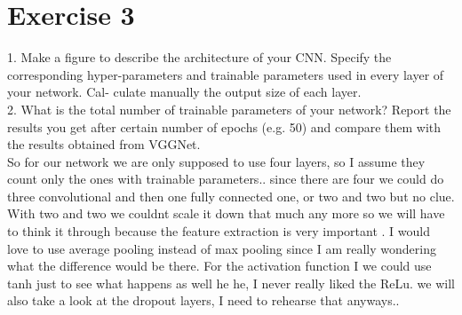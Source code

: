 \section*{Exercise 3}





1. Make a figure to describe the architecture of your CNN. Specify the corresponding
hyper-parameters and trainable parameters used in every layer of your network. Cal-
culate manually the output size of each layer. \\
2. What is the total number of trainable parameters of your network? Report the results
you get after certain number of epochs (e.g. 50) and compare them with the results
obtained from VGGNet.\\

So for our network we are only supposed to use four layers, so I assume they count only the ones with trainable parameters.. since there are four we could do three convolutional and then one fully connected one, or two and two but no clue. With two and two we couldnt scale it down that much any more so we will have to think it through because the feature extraction is very important . 
I would love to use average pooling instead of max pooling since I am really wondering what the difference would be there.
For the activation function I we could use tanh just to see what happens as well he he, I never really liked the ReLu. we will also take a look at the dropout layers, I need to rehearse that anyways..
